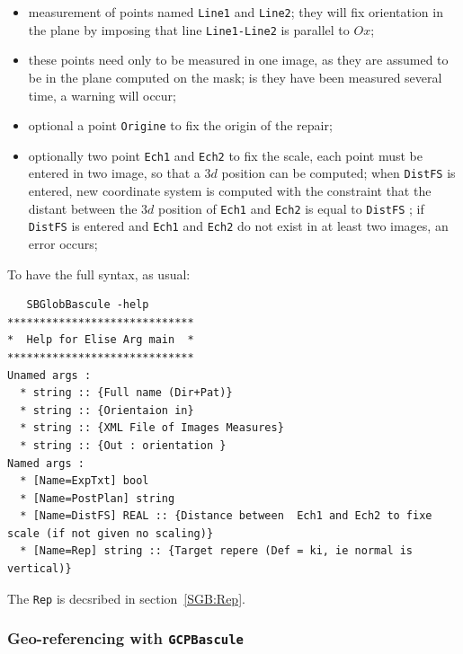 \begin{itemize}
   \item measurement of points named {\tt Line1} and  {\tt Line2};
         they will fix orientation in the plane by imposing that line
           {\tt Line1-Line2} is parallel to $Ox$;

   \item these points need only to be measured in one image, as they are
         assumed  to be in the plane  computed on the mask; is they have been
         measured several time, a warning will occur;

   \item optional a point {\tt Origine} to fix the origin of the repair;

   \item optionally two point {\tt Ech1} and {\tt Ech2} to fix the scale,
         each point must be entered in two image, so that a $3d$ position
         can be computed; when {\tt DistFS} is entered, new coordinate system
         is computed with the constraint that the distant between the $3d$
         position of  {\tt Ech1} and {\tt Ech2} is equal to {\tt DistFS} ;
         if {\tt DistFS} is entered and {\tt Ech1} and {\tt Ech2} do not
         exist in at least two images, an error occurs;
\end{itemize}

To have the full syntax, as usual:

\begin{verbatim}
   SBGlobBascule -help
*****************************
*  Help for Elise Arg main  *
*****************************
Unamed args :
  * string :: {Full name (Dir+Pat)}
  * string :: {Orientaion in}
  * string :: {XML File of Images Measures}
  * string :: {Out : orientation }
Named args :
  * [Name=ExpTxt] bool
  * [Name=PostPlan] string
  * [Name=DistFS] REAL :: {Distance between  Ech1 and Ech2 to fixe scale (if not given no scaling)}
  * [Name=Rep] string :: {Target repere (Def = ki, ie normal is vertical)}
\end{verbatim}

The {\tt Rep} is decsribed in section~\ref{SGB:Rep}.


\subsubsection{Geo-referencing with {\tt GCPBascule}}

\label{Sec:GCPBascule}

